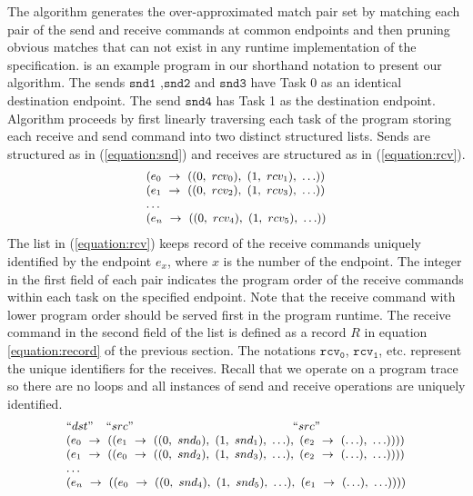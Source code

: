 The algorithm generates the over-approximated match pair set by matching each pair of the send and receive commands at common endpoints and then pruning obvious matches that can not exist in any runtime implementation of the specification.  is an example program in our shorthand notation to present our algorithm. The sends $\mathtt{snd1}$ ,$\mathtt{snd2}$ and $\mathtt{snd3}$ have Task 0 as an identical destination endpoint. The send $\mathtt{snd4}$ has Task 1 as the destination endpoint.
Algorithm proceeds by first linearly traversing each task of the program storing each receive and send command into two distinct structured lists. Sends are structured as in (\ref{equation:snd}) and receives are structured as in (\ref{equation:rcv}). 
\begin{equation}
\footnotesize \begin{array}{l}
(e_0\ \rightarrow\ ((0,\ rcv_{0}),\ (1,\ rcv_{1}),\ \ldots))\\
(e_1\ \rightarrow\ ((0,\ rcv_{2}),\ (1,\ rcv_{3}),\ \ldots))\\
\ldots \\
(e_n\ \rightarrow\ ((0,\ rcv_{4}),\ (1,\ rcv_{5}),\ \ldots))\\
\end{array}
\label{equation:rcv}
\end{equation}
The list in (\ref{equation:rcv}) keeps record of the receive commands uniquely identified by the endpoint $\mathit{e}_x$, where $x$ is the number of the endpoint. The integer in the first field of each pair indicates the program order of the receive commands within each task on the specified endpoint. Note that the receive command with lower program order should be served first in the program runtime. The receive command in the second field of the list is defined as a record $R$ in equation \ref{equation:record} of the previous section. The notations $\mathtt{rcv_{0}}$, $\mathtt{rcv_{1}}$, etc. represent the unique identifiers for the receives. Recall that we operate on a program trace so there are no loops and all instances of send and receive operations are uniquely identified.
\begin{equation}
\footnotesize \begin{array}{l}
 ``dst" \;\;\;\; ``src" \;\;\;\;\;\;\;\;\;\;\;\;\;\;\;\;\;\;\;\;\;\;\;\;\;\;\;\;\;\;\;\;\;\;\;\;\;\;\;\;\;\;\;\;\;\;\;\;\; ``src"\\
(e_0\ \rightarrow\ ((e_1\ \rightarrow\ ((0,\ snd_{0}),\ (1,\ snd_{1}),\ \ldots),\ (e_2\ \rightarrow\ (\ldots),\ \ldots))))\\
(e_1\ \rightarrow\ ((e_0\ \rightarrow\ ((0,\ snd_{2}),\ (1,\ snd_{3}),\ \ldots),\ (e_2\ \rightarrow\ (\ldots),\ \ldots))))\\
 \dots\\
(e_n\ \rightarrow\ ((e_0\ \rightarrow\ ((0,\ snd_{4}),\ (1,\ snd_{5}),\ \ldots),\ (e_1\ \rightarrow\ (\ldots),\ \ldots))))\\
\end{array}
\label{equation:snd}
\end{equation}
